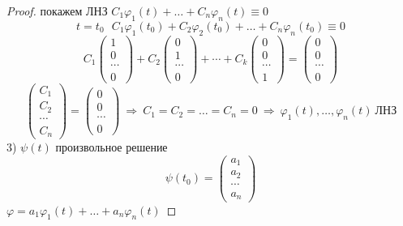 \begin{proof}
  покажем ЛНЗ $C_1 \varphi_1(t) + \ldots + C_n \varphi_n(t) \equiv 0$
  $$
  t = t_0 ~~~ C_1 \varphi_1(t_0) + C_2 \varphi_2(t_0) + \ldots +
  C_n \varphi_n(t_0) \equiv 0
  $$
  $$
  C_1
  \left(
  \begin{array}{c}
    1 \\
    0 \\
    \cdots \\
    0
  \end{array}
  \right) +
  C_2
  \left(
  \begin{array}{c}
    0 \\
    1 \\
    \cdots \\
    0
  \end{array}
  \right) + \cdots +
  C_k
  \left(
  \begin{array}{c}
    0 \\
    0 \\
    \cdots \\
    1
  \end{array}
  \right) =
  \left(
  \begin{array}{c}
    0 \\
    0 \\
    \cdots \\
    0
  \end{array}
  \right)
  $$
  $$
  \left(
  \begin{array}{c}
    C_1 \\
    C_2 \\
    \cdots \\
    C_n
  \end{array}
  \right) =
  \left(
  \begin{array}{c}
    0 \\
    0 \\
    \cdots \\
    0
  \end{array}
  \right) ~ \Rightarrow ~ C_1 = C_2 = \ldots = C_n = 0 ~ \Rightarrow ~
  \varphi_1(t), \ldots, \varphi_n(t) ~ \text{ЛНЗ}
  $$
  3) $\psi(t)$ произвольное решение
  $$
  \psi(t_0) =
  \left(
  \begin{array}{c}
    a_1 \\
    a_2 \\
    \cdots \\
    a_n
  \end{array}
  \right)
  $$
  $\varphi = a_1 \varphi_1(t) + \ldots + a_n \varphi_n(t)$


\end{proof}
